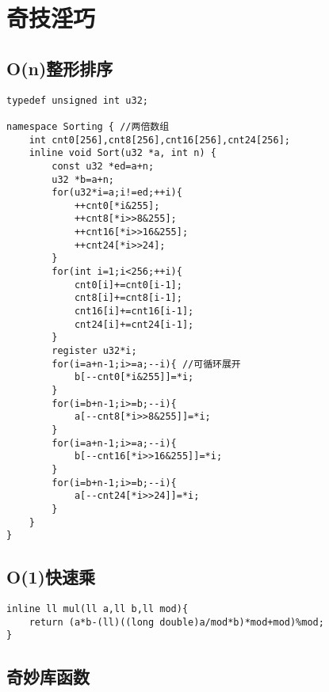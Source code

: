 \documentclass{ctexart}
\begin{document}
\section{奇技淫巧}
\subsection{O(n)整形排序}
\begin{lstlisting}
typedef unsigned int u32;

namespace Sorting { //两倍数组
    int cnt0[256],cnt8[256],cnt16[256],cnt24[256];
    inline void Sort(u32 *a, int n) {
        const u32 *ed=a+n;
        u32 *b=a+n;
        for(u32*i=a;i!=ed;++i){
            ++cnt0[*i&255];
            ++cnt8[*i>>8&255];
            ++cnt16[*i>>16&255];
            ++cnt24[*i>>24];
        }
        for(int i=1;i<256;++i){
            cnt0[i]+=cnt0[i-1];
            cnt8[i]+=cnt8[i-1];
            cnt16[i]+=cnt16[i-1];
            cnt24[i]+=cnt24[i-1];
        }
        register u32*i;
        for(i=a+n-1;i>=a;--i){ //可循环展开
            b[--cnt0[*i&255]]=*i;
        }
        for(i=b+n-1;i>=b;--i){
            a[--cnt8[*i>>8&255]]=*i;
        }
        for(i=a+n-1;i>=a;--i){
            b[--cnt16[*i>>16&255]]=*i;
        }
        for(i=b+n-1;i>=b;--i){
            a[--cnt24[*i>>24]]=*i;
        }
    }
}
\end{lstlisting}
\subsection{O(1)快速乘}
\begin{lstlisting}
inline ll mul(ll a,ll b,ll mod){
	return (a*b-(ll)((long double)a/mod*b)*mod+mod)%mod;
}
\end{lstlisting}
\subsection{奇妙库函数}
\end{document}
